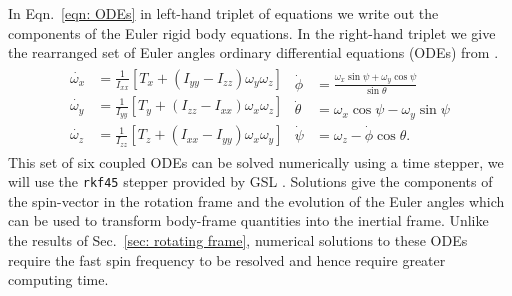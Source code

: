 \documentclass[../full_thesis/full_thesis.tex]{subfiles}
\begin{document}
In Eqn.~\eqref{eqn: ODEs} in left-hand triplet of equations we write out the
components of the Euler rigid body equations. In the right-hand triplet we
give the rearranged set of Euler angles ordinary differential equations (ODEs)
from \citet{Landau1969}.
\begin{align}
\begin{split}
\dot{\omega_{x}} & = \frac{1}{I_{xx}}\left[T_{x} +
                      \left(I_{yy} - I_{zz}\right) \omega_{y} \omega_{z}\right]
\\
\dot{\omega_{y}} & = \frac{1}{I_{yy}}\left[T_{y} +
                      \left(I_{zz} - I_{xx}\right) \omega_{x} \omega_{z}\right]
\\
\dot{\omega_{z}} & =\frac{1}{I_{zz}}\left[T_{z} +
                      \left(I_{xx} - I_{yy}\right) \omega_{x} \omega_{y}\right]
\end{split}
\begin{split}
\dot{\phi} & = \frac{\omega_{x} \sin \psi + \omega_{y} \cos \psi}{\sin \theta}\\
\dot{\theta} & = \omega_{x} \cos \psi - \omega_{y} \sin \psi\\
\dot{\psi} & = \omega_{z} - \dot{\phi} \cos \theta.
\end{split}
\label{eqn: ODEs}
\end{align}
This set of six coupled ODEs can be solved numerically using a time stepper, we
will use the \texttt{rkf45} stepper provided by GSL \citep{gough2009gnu}.
Solutions give the components of the spin-vector in the rotation frame and the
evolution of the Euler angles which can be used to transform body-frame
quantities into the inertial frame. Unlike the results of Sec.~\ref{sec:
rotating frame}, numerical solutions to these ODEs require the fast spin frequency
to be resolved and hence require greater computing time.


\end{document}
